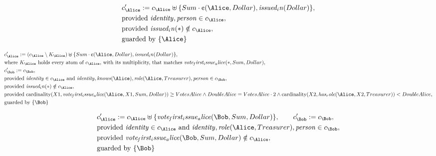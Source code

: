 \begin{align*}
&
c'_
{
\Alice
}
 := 
c_
{
\Alice
}
 \uplus 
\{
Sum
\cdot
\text{\textcent}
(
\Alice
,
Dollar
)
,
\mathit{
issued_in
}
(
Dollar
)
\}
,\\
&
\text{provided } 
\mathit{
identity
}
,
\mathit{
person
}
 \in c_
{
\Alice
}
,\\
&
\text{provided } 
\mathit{
issued_in
}
(
\ast
)
 \notin c_
{
\Alice
}
,\\
&
\text{guarded by } \{
\Alice
\}
\end{align*}

\begin{align*}
&
c'_
{
\Alice
}
 := 
(
c_
{
\Alice
}
 \setminus K_
{
\Alice
}
) \uplus 
\{
Sum
\cdot
\text{\textcent}
(
\Alice
,
Dollar
)
,
\mathit{
issued_in
}
(
Dollar
)
\}
,\\
&
\text{where } K_
{
\Alice
}
 \text{ holds every atom of } c_
{
\Alice
}
 \text{, with its multiplicity, that matches } 
\mathit{
vote_first_issue_alice
}
(
\ast
,
Sum
,
Dollar
)
,\\
&
c'_
{
\Bob
}
 := 
c_
{
\Bob
}
,\\
&
\text{provided } 
\mathit{
identity
}
 \in c_
{
\Alice
}
 \text{ and } 
\mathit{
identity
}
,
\mathit{
knows
}
(
\Alice
)
,
\mathit{
role
}
(
\Alice
,
Treasurer
)
,
\mathit{
person
}
 \in c_
{
\Bob
}
,\\
&
\text{provided } 
\mathit{
issued_in
}
(
\ast
)
 \notin c_
{
\Alice
}
,\\
&
\text{provided } 
\mathrm{cardinality}(
X1
,
\mathit{
vote_first_issue_alice
}
(
\Alice
,
X1
,
Sum
,
Dollar
)
)
\ge
VotesAlice
\land
DoubleAlice
=
VotesAlice
\cdot
2
\land
\mathrm{cardinality}(
X2
,
\mathit{
has_role
}
(
\Alice
,
X2
,
Treasurer
)
)
<
DoubleAlice
,\\
&
\text{guarded by } \{
\Bob
\}
\end{align*}

\begin{align*}
&
c'_
{
\Alice
}
 := 
c_
{
\Alice
}
 \uplus 
\{
\mathit{
vote_first_issue_alice
}
(
\Bob
,
Sum
,
Dollar
)
\}
, \qquad 
c'_
{
\Bob
}
 := 
c_
{
\Bob
}
,\\
&
\text{provided } 
\mathit{
identity
}
 \in c_
{
\Alice
}
 \text{ and } 
\mathit{
identity
}
,
\mathit{
role
}
(
\Alice
,
Treasurer
)
,
\mathit{
person
}
 \in c_
{
\Bob
}
,\\
&
\text{provided } 
\mathit{
vote_first_issue_alice
}
(
\Bob
,
Sum
,
Dollar
)
 \notin c_
{
\Alice
}
,\\
&
\text{guarded by } \{
\Bob
\}
\end{align*}
